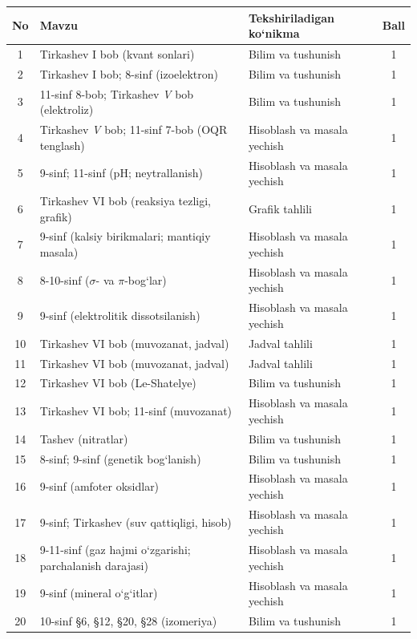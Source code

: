 \documentclass[11pt,a4paper]{article}
\begin{document}
{\small\noindent\begin{longtable}{|c|p{7.2cm}|p{5.4cm}|c|}\hline \textbf{No} & \textbf{Mavzu} & \textbf{Tekshiriladigan ko`nikma} & \textbf{Ball}\\\hline
1 & Tirkashev I bob (kvant sonlari) & Bilim va tushunish & 1\\\hline
2 & Tirkashev I bob; 8-sinf (izoelektron) & Bilim va tushunish & 1\\\hline
3 & 11-sinf 8-bob; Tirkashev \textit{V} bob (elektroliz) & Bilim va tushunish & 1\\\hline
4 & Tirkashev \textit{V} bob; 11-sinf 7-bob (OQR tenglash) & Hisoblash va masala yechish & 1\\\hline
5 & 9-sinf; 11-sinf (pH; neytrallanish) & Hisoblash va masala yechish & 1\\\hline
6 & Tirkashev VI bob (reaksiya tezligi, grafik) & Grafik tahlili & 1\\\hline
7 & 9-sinf (kalsiy birikmalari; mantiqiy masala) & Hisoblash va masala yechish & 1\\\hline
8 & 8-10-sinf ($\sigma$- va $\pi$-bog`lar) & Hisoblash va masala yechish & 1\\\hline
9 & 9-sinf (elektrolitik dissotsilanish) & Hisoblash va masala yechish & 1\\\hline
10 & Tirkashev VI bob (muvozanat, jadval) & Jadval tahlili & 1\\\hline
11 & Tirkashev VI bob (muvozanat, jadval) & Jadval tahlili & 1\\\hline
12 & Tirkashev VI bob (Le-Shatelye) & Bilim va tushunish & 1\\\hline
13 & Tirkashev VI bob; 11-sinf (muvozanat) & Hisoblash va masala yechish & 1\\\hline
14 & Tashev (nitratlar) & Bilim va tushunish & 1\\\hline
15 & 8-sinf; 9-sinf (genetik bog`lanish) & Bilim va tushunish & 1\\\hline
16 & 9-sinf (amfoter oksidlar) & Hisoblash va masala yechish & 1\\\hline
17 & 9-sinf; Tirkashev (suv qattiqligi, hisob) & Hisoblash va masala yechish & 1\\\hline
18 & 9-11-sinf (gaz hajmi o`zgarishi; parchalanish darajasi) & Hisoblash va masala yechish & 1\\\hline
19 & 9-sinf (mineral o`g`itlar) & Hisoblash va masala yechish & 1\\\hline
20 & 10-sinf \S{}6, \S{}12, \S{}20, \S{}28 (izomeriya) & Bilim va tushunish & 1\\\hline

\end{longtable}}
\end{document}
